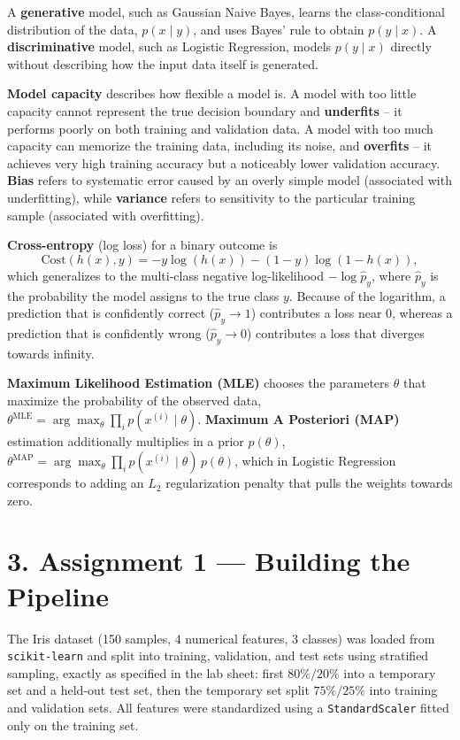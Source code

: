 \documentclass[12pt,a4paper]{article}
\begin{document}
A \textbf{generative} model, such as Gaussian Naive Bayes, learns the class-conditional distribution of the data, $p(x \mid y)$, and uses Bayes' rule to obtain $p(y \mid x)$. A \textbf{discriminative} model, such as Logistic Regression, models $p(y \mid x)$ directly without describing how the input data itself is generated.

\textbf{Model capacity} describes how flexible a model is. A model with too little capacity cannot represent the true decision boundary and \textbf{underfits} -- it performs poorly on both training and validation data. A model with too much capacity can memorize the training data, including its noise, and \textbf{overfits} -- it achieves very high training accuracy but a noticeably lower validation accuracy. \textbf{Bias} refers to systematic error caused by an overly simple model (associated with underfitting), while \textbf{variance} refers to sensitivity to the particular training sample (associated with overfitting).

\textbf{Cross-entropy} (log loss) for a binary outcome is
\[
  \mathrm{Cost}(h(x), y) = -y\log(h(x)) - (1-y)\log(1-h(x)),
\]
which generalizes to the multi-class negative log-likelihood $-\log \hat{p}_{y}$, where $\hat{p}_y$ is the probability the model assigns to the true class $y$. Because of the logarithm, a prediction that is confidently correct ($\hat{p}_y \to 1$) contributes a loss near $0$, whereas a prediction that is confidently wrong ($\hat{p}_y \to 0$) contributes a loss that diverges towards infinity.

\textbf{Maximum Likelihood Estimation (MLE)} chooses the parameters $\theta$ that maximize the probability of the observed data, $\theta^{\mathrm{MLE}} = \arg\max_\theta \prod_i p(x^{(i)} \mid \theta)$. \textbf{Maximum A Posteriori (MAP)} estimation additionally multiplies in a prior $p(\theta)$, $\theta^{\mathrm{MAP}} = \arg\max_\theta \prod_i p(x^{(i)}\mid\theta)\,p(\theta)$, which in Logistic Regression corresponds to adding an $L_2$ regularization penalty that pulls the weights towards zero.

\section*{3. Assignment 1 --- Building the Pipeline}

\begin{sloppypar}
The Iris dataset (150 samples, 4 numerical features, 3 classes) was loaded from \texttt{scikit-learn} and split into training, validation, and test sets using stratified sampling, exactly as specified in the lab sheet: first $80\%/20\%$ into a temporary set and a held-out test set, then the temporary set split $75\%/25\%$ into training and validation sets. All features were standardized using a \texttt{StandardScaler} fitted only on the training set.
\end{sloppypar}
\end{document}

